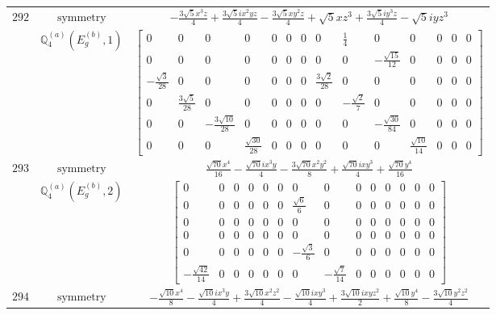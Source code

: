 \documentclass[fleqn,8pt,landscape]{jsarticle}
\begin{document}
\begin{longtable}{ccc}
$ 292 $ & $ \text{symmetry} $ & $ - \frac{3 \sqrt{5} x^{3} z}{4} + \frac{3 \sqrt{5} i x^{2} y z}{4} - \frac{3 \sqrt{5} x y^{2} z}{4} + \sqrt{5} x z^{3} + \frac{3 \sqrt{5} i y^{3} z}{4} - \sqrt{5} i y z^{3} $ \\
$  $ & $ \mathbb{Q}_{4}^{(a)}(E_{g}^{(b)},1) $ & $ \begin{bmatrix} 0 & 0 & 0 & 0 & 0 & 0 & 0 & 0 & \frac{1}{4} & 0 & 0 & 0 & 0 & 0 \\ 0 & 0 & 0 & 0 & 0 & 0 & 0 & 0 & 0 & - \frac{\sqrt{15}}{12} & 0 & 0 & 0 & 0 \\ - \frac{\sqrt{3}}{28} & 0 & 0 & 0 & 0 & 0 & 0 & \frac{3 \sqrt{2}}{28} & 0 & 0 & 0 & 0 & 0 & 0 \\ 0 & \frac{3 \sqrt{5}}{28} & 0 & 0 & 0 & 0 & 0 & 0 & - \frac{\sqrt{2}}{7} & 0 & 0 & 0 & 0 & 0 \\ 0 & 0 & - \frac{3 \sqrt{10}}{28} & 0 & 0 & 0 & 0 & 0 & 0 & - \frac{\sqrt{30}}{84} & 0 & 0 & 0 & 0 \\ 0 & 0 & 0 & \frac{\sqrt{30}}{28} & 0 & 0 & 0 & 0 & 0 & 0 & \frac{\sqrt{10}}{14} & 0 & 0 & 0 \end{bmatrix} $ \\ \hline
$ 293 $ & $ \text{symmetry} $ & $ \frac{\sqrt{70} x^{4}}{16} - \frac{\sqrt{70} i x^{3} y}{4} - \frac{3 \sqrt{70} x^{2} y^{2}}{8} + \frac{\sqrt{70} i x y^{3}}{4} + \frac{\sqrt{70} y^{4}}{16} $ \\
$  $ & $ \mathbb{Q}_{4}^{(a)}(E_{g}^{(b)},2) $ & $ \begin{bmatrix} 0 & 0 & 0 & 0 & 0 & 0 & 0 & 0 & 0 & 0 & 0 & 0 & 0 & 0 \\ 0 & 0 & 0 & 0 & 0 & 0 & \frac{\sqrt{6}}{6} & 0 & 0 & 0 & 0 & 0 & 0 & 0 \\ 0 & 0 & 0 & 0 & 0 & 0 & 0 & 0 & 0 & 0 & 0 & 0 & 0 & 0 \\ 0 & 0 & 0 & 0 & 0 & 0 & 0 & 0 & 0 & 0 & 0 & 0 & 0 & 0 \\ 0 & 0 & 0 & 0 & 0 & 0 & - \frac{\sqrt{3}}{6} & 0 & 0 & 0 & 0 & 0 & 0 & 0 \\ - \frac{\sqrt{42}}{14} & 0 & 0 & 0 & 0 & 0 & 0 & - \frac{\sqrt{7}}{14} & 0 & 0 & 0 & 0 & 0 & 0 \end{bmatrix} $ \\ \hline
$ 294 $ & $ \text{symmetry} $ & $ - \frac{\sqrt{10} x^{4}}{8} - \frac{\sqrt{10} i x^{3} y}{4} + \frac{3 \sqrt{10} x^{2} z^{2}}{4} - \frac{\sqrt{10} i x y^{3}}{4} + \frac{3 \sqrt{10} i x y z^{2}}{2} + \frac{\sqrt{10} y^{4}}{8} - \frac{3 \sqrt{10} y^{2} z^{2}}{4} $ \\

\end{longtable}
\end{document}
